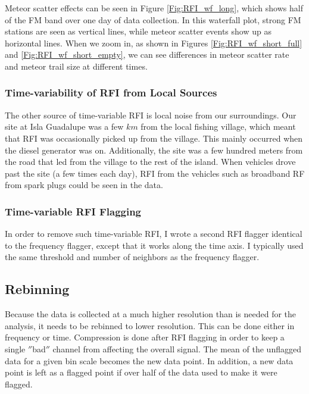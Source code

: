 Meteor scatter effects can be seen in Figure \ref{Fig:RFI_wf_long}, which shows half of the FM band over one day of data collection. In this waterfall plot, strong FM stations are seen as vertical lines, while meteor scatter events show up as horizontal lines. When we zoom in, as shown in Figures \ref{Fig:RFI_wf_short_full} and \ref{Fig:RFI_wf_short_empty}, we can see differences in meteor scatter rate and meteor trail size at different times.

\subsubsection{Time-variability of RFI from Local Sources}

The other source of time-variable RFI is local noise from our surroundings. Our site at Isla Guadalupe was a few $km$ from the local fishing village, which meant that RFI was occasionally picked up from the village. This mainly occurred when the diesel generator was on. Additionally, the site was a few hundred meters from the road that led from the village to the rest of the island. When vehicles drove past the site (a few times each day), RFI from the vehicles such as broadband RF from spark plugs could be seen in the data. 

\subsubsection{Time-variable RFI Flagging}

In order to remove such time-variable RFI, I wrote a second RFI flagger identical to the frequency flagger, except that it works along the time axis. I typically used the same threshold and number of neighbors as the frequency flagger. 


\subsection{Rebinning}

Because the data is collected at a much higher resolution than is needed for the analysis, it needs to be rebinned to lower resolution. This can be done either in frequency or time. Compression is done after RFI flagging in order to keep a single $''$bad$''$ channel from affecting the overall signal. The mean of the unflagged data for a given bin scale becomes the new data point. In addition, a new data point is left as a flagged point if over half of the data used to make it were flagged. 



